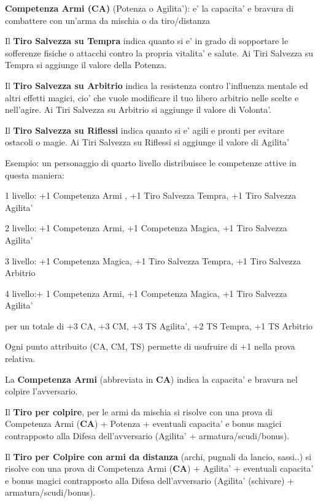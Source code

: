 \documentclass[a4paper,11pt,twoside,openany]{book}
\begin{document}
\textbf{Competenza Armi (CA)} (Potenza o Agilita'): e' la capacita' e bravura di combattere con un'arma da mischia o da tiro/distanza

Il \textbf{Tiro Salvezza su Tempra} indica quanto si e' in grado di sopportare le sofferenze fisiche o attacchi contro la propria vitalita' e salute. Ai Tiri Salvezza su Tempra si aggiunge il valore della Potenza. 

Il \textbf{Tiro Salvezza su Arbitrio} indica la resistenza contro l'influenza mentale ed altri effetti magici, cio' che vuole modificare il tuo libero arbitrio nelle scelte e nell'agire. Ai Tiri Salvezza su Arbitrio si aggiunge il valore di Volonta'.

Il \textbf{Tiro Salvezza su Riflessi} indica quanto si e' agili e pronti per evitare ostacoli o magie. Ai Tiri Salvezza su Riflessi si aggiunge il valore di Agilita'

\bigskip

Esempio: un personaggio di quarto livello distribuisce le competenze
attive in questa maniera:

1 livello: +1 Competenza Armi , +1 Tiro Salvezza Tempra, +1 Tiro Salvezza Agilita'

2 livello: +1 Competenza Armi, +1 Competenza Magica, +1 Tiro Salvezza Agilita'

3 livello: +1 Competenza Magica, +1 Tiro Salvezza Tempra, +1 Tiro Salvezza Arbitrio

4 livello:+ 1 Competenza Armi, +1 Competenza Magica, +1 Tiro Salvezza Agilita'

per un totale di +3 CA, +3 CM, +3 TS Agilita', +2 TS Tempra, +1 TS Arbitrio

\bigskip

Ogni punto attribuito (CA, CM, TS) permette di usufruire di +1 nella prova relativa.

La \textbf{Competenza Armi} (abbreviata in \textbf{CA}) indica la capacita' e bravura nel colpire l'avversario.

Il \textbf{Tiro per colpire}, per le armi da mischia si risolve con una prova di Competenza Armi (\textbf{CA}) + Potenza + eventuali capacita' e bonus magici contrapposto alla Difesa dell'avversario (Agilita' + armatura/scudi/bonus).

Il \textbf{Tiro per Colpire con armi da distanza} (archi, pugnali da lancio, sassi..) si risolve con una prova di Competenza Armi (\textbf{CA}) + Agilita' + eventuali capacita' e bonus magici contrapposto alla Difesa dell'avversario (Agilita' (schivare) + armatura/scudi/bonus).
\end{document}
